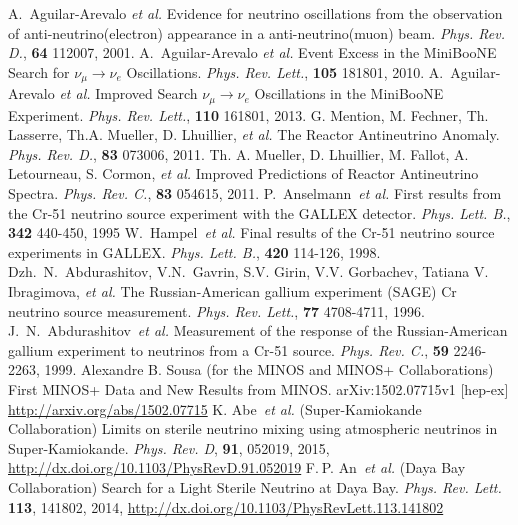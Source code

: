 \documentclass[aps,prd,twocolumn,nofootinbib]{revtex4-1}
\begin{document}
\begin{thebibliography}{9}
  A.~Aguilar-Arevalo \emph{et al.} Evidence for neutrino oscillations from the observation of anti-neutrino(electron) appearance in a anti-neutrino(muon) beam. \emph{Phys. Rev. D.}, {\bf 64} 112007, 2001.
  A.~Aguilar-Arevalo \emph{et al.} Event Excess in the MiniBooNE Search for $\nu_\mu \rightarrow \nu_e$ Oscillations. \emph{Phys. Rev. Lett.}, {\bf 105} 181801, 2010.
  A.~Aguilar-Arevalo \emph{et al.} Improved Search $\nu_\mu \rightarrow \nu_e$ Oscillations in the MiniBooNE Experiment. \emph{Phys. Rev. Lett.}, {\bf 110} 161801, 2013.
  G. Mention, M. Fechner, Th. Lasserre, Th.A. Mueller, D. Lhuillier, \emph{et al.} The Reactor Antineutrino Anomaly. \emph{Phys. Rev. D.}, {\bf 83} 073006, 2011.
  Th. A. Mueller, D. Lhuillier, M. Fallot, A. Letourneau, S. Cormon, \emph{et al.} Improved Predictions of Reactor Antineutrino Spectra. \emph{Phys. Rev. C.}, {\bf 83} 054615, 2011.
  P.~Anselmann~\emph{et al.} First results from the Cr-51 neutrino source experiment with the GALLEX detector. \emph{Phys. Lett. B.}, {\bf 342} 440-450, 1995
  W.~Hampel~\emph{et al.} Final results of the Cr-51 neutrino source experiments in GALLEX. \emph{Phys. Lett. B.}, {\bf 420} 114-126, 1998.
  Dzh.~N.~Abdurashitov, V.N.~Gavrin, S.V. Girin, V.V. Gorbachev, Tatiana V. Ibragimova, \emph{et al.} The Russian-American gallium experiment (SAGE) Cr neutrino source measurement. \emph{Phys. Rev. Lett.}, {\bf 77} 4708-4711, 1996.
  J.~N.~Abdurashitov~\emph{et al.} Measurement of the response of the Russian-American gallium experiment to neutrinos from a Cr-51 source. \emph{Phys. Rev. C.}, {\bf 59} 2246-2263, 1999.
  Alexandre B. Sousa (for the MINOS and MINOS+ Collaborations) First MINOS+ Data and New Results from MINOS. arXiv:1502.07715v1 [hep-ex] \url{http://arxiv.org/abs/1502.07715}
  K. Abe~\emph{et al.} (Super-Kamiokande Collaboration) Limits on sterile neutrino mixing using atmospheric neutrinos in Super-Kamiokande. \emph{Phys. Rev. D}, {\bf 91}, 052019, 2015, \url{http://dx.doi.org/10.1103/PhysRevD.91.052019}
 F. P. An~\emph{et al.} (Daya Bay Collaboration) Search for a Light Sterile Neutrino at Daya Bay. \emph{Phys. Rev. Lett.} {\bf 113}, 141802, 2014, \url{http://dx.doi.org/10.1103/PhysRevLett.113.141802}

\end{thebibliography}
\end{document}

